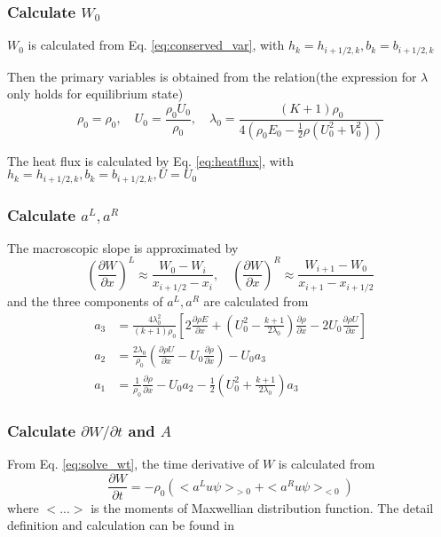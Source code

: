 \documentclass[a4paper]{book}
\begin{document}
\subsubsection*{Calculate $W_0$}
$W_0$ is calculated from Eq. \ref{eq:conserved_var}, with $h_k=h_{i+1/2,k}, b_k=b_{i+1/2,k}$

Then the primary variables is obtained from the relation(the expression for $\lambda$ only holds for equilibrium state)
$$\rho_0 = \rho_0,\quad U_0=\frac{\rho_0 U_0}{\rho_0},\quad \lambda_0=\frac{(K+1)\rho_0}{4\left(\rho_0 E_0-\frac{1}{2}\rho(U_0^2+V_0^2)\right)}$$

The heat flux is calculated by Eq. \ref{eq:heatflux}, with $h_k=h_{i+1/2,k},b_k=b_{i+1/2,k},U=U_0$

\subsubsection*{Calculate $a^L,a^R$}
The macroscopic slope is approximated by
$$\left(\frac{\partial W}{\partial x}\right)^L\approx\frac{W_0-W_{i}}{x_{i+1/2}-x_i},\quad \left(\frac{\partial W}{\partial x}\right)^R\approx\frac{W_{i+1}-W_{0}}{x_{i+1}-x_{i+1/2}}$$
and the three components of $a^L,a^R$ are calculated from
\begin{equation} 
    \label{eq:micro_slope}
    \begin{aligned}
        a_3&=\frac{4\lambda_0^2}{(k+1)\rho_0}\left[2\frac{\partial\rho E}{\partial x}+\left(U_0^2-\frac{k+1}{2\lambda_0}\right)\frac{\partial\rho}{\partial x}-2U_0\frac{\partial\rho U}{\partial x}\right]\\
        a_2&=\frac{2\lambda_0}{\rho_0}\left(\frac{\partial\rho U}{\partial x}-U_0\frac{\partial\rho}{\partial x}\right)-U_0a_3\\
        a_1&=\frac{1}{\rho_0}\frac{\partial\rho}{\partial x}-U_0a_2-\frac{1}{2}\left(U_0^2+\frac{k+1}{2\lambda_0}\right)a_3
    \end{aligned}
\end{equation}

\subsubsection*{Calculate ${\partial W}/{\partial t}$ and $A$}
From Eq. \ref{eq:solve_wt}, the time derivative of $W$ is calculated from
$$\frac{\partial W}{\partial t}=-\rho_0\left(<a^Lu\psi>_{>0}+<a^Ru\psi>_{<0}\right)$$
where $<...>$ is the moments of Maxwellian distribution function. The detail definition and calculation can be found in 
\end{document}
